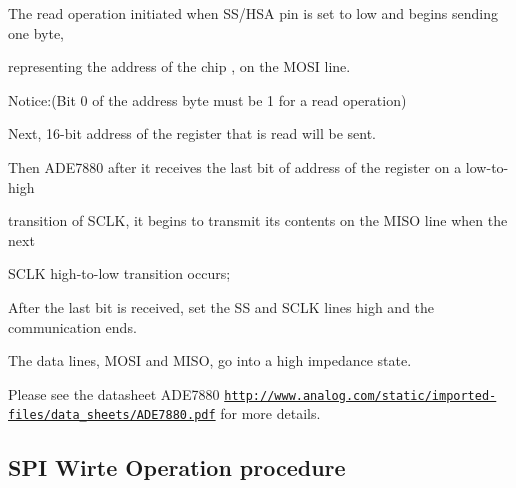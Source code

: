 \begin{DoxyItemize}
\item The read operation initiated when S\-S/\-H\-S\-A pin is set to low and begins sending one byte, \par
 representing the address of the chip , on the M\-O\-S\-I line. \par
 Notice\-:(\-Bit 0 of the address byte must be 1 for a read operation) \par
\end{DoxyItemize}
\begin{DoxyItemize}
\item Next, 16-\/bit address of the register that is read will be sent. \par
\end{DoxyItemize}
\begin{DoxyItemize}
\item Then A\-D\-E7880 after it receives the last bit of address of the register on a low-\/to-\/high \par
 transition of S\-C\-L\-K, it begins to transmit its contents on the M\-I\-S\-O line when the next \par
 S\-C\-L\-K high-\/to-\/low transition occurs; \par
\end{DoxyItemize}
\begin{DoxyItemize}
\item After the last bit is received, set the S\-S and S\-C\-L\-K lines high and the communication ends. \par
\end{DoxyItemize}
\begin{DoxyItemize}
\item The data lines, M\-O\-S\-I and M\-I\-S\-O, go into a high impedance state. \par
 \par
\end{DoxyItemize}
Please see the datasheet A\-D\-E7880 \href{http://www.analog.com/static/imported-files/data_sheets/ADE7880.pdf}{\tt http\-://www.\-analog.\-com/static/imported-\/files/data\-\_\-sheets/\-A\-D\-E7880.\-pdf} for more details. \par
\par
\par
\hypertarget{de/d21/a00006_WRITE}{}\subsection{S\-P\-I Wirte Operation procedure}\label{de/d21/a00006_WRITE}
 

